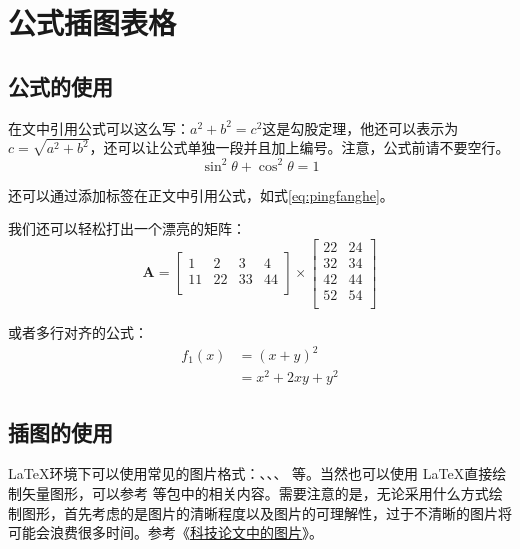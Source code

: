 
\chapter{公式插图表格}

\section{公式的使用}
在文中引用公式可以这么写：$a^2+b^2=c^2$这是勾股定理，他还可以表示为$c=\sqrt{a^2+b^2}$，还可以让公式单独一段并且加上编号。注意，公式前请不要空行。
\begin{equation}
\sin^2{\theta}+\cos^2{\theta}=1 \label{eq:pingfanghe}
\end{equation}

还可以通过添加标签在正文中引用公式，如式\eqref{eq:pingfanghe}。

我们还可以轻松打出一个漂亮的矩阵：
\begin{equation}
  \bm{A}=
  \begin{bmatrix}
    1&2&3&4\\
    11&22&33&44\\
  \end{bmatrix} \times
  \begin{bmatrix}
    22&24\\
    32&34\\
    42&44\\
    52&54\\
  \end{bmatrix}
\end{equation}

或者多行对齐的公式：
\begin{equation}
  \begin{aligned}
    f_1(x)&=(x+y)^2\\
          &=x^2+2xy+y^2
  \end{aligned}
\end{equation}


\section{插图的使用}

\LaTeX 环境下可以使用常见的图片格式：、、、 等。当然也可以使用 \LaTeX 直接绘制矢量图形，可以参考  等包中的相关内容。需要注意的是，无论采用什么方式绘制图形，首先考虑的是图片的清晰程度以及图片的可理解性，过于不清晰的图片将可能会浪费很多时间。参考《\href{https://liam.page/2019/07/30/figures-in-scitech-papers/}{科技论文中的图片}》。

